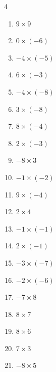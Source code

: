\begin{multicols}{4}
\begin{enumerate}
  \item $9\times 9$
        \phantom{$=81$}

  \item $0\times (-6)$
        \phantom{$=0$}

  \item $-4\times (-5)$
        \phantom{$=20$}

  \item $6\times (-3)$
        \phantom{$=-18$}

  \item $-4\times (-8)$
        \phantom{$=32$}

  \item $3\times (-8)$
        \phantom{$=-24$}

  \item $8\times (-4)$
        \phantom{$=-32$}

  \item $2\times (-3)$
        \phantom{$=-6$}

  \item $-8\times 3$
        \phantom{$=-24$}

  \item $-1\times (-2)$
        \phantom{$=2$}

  \item $9\times (-4)$
        \phantom{$=-36$}

  \item $2\times 4$
        \phantom{$=8$}

  \item $-1\times (-1)$
        \phantom{$=1$}

  \item $2\times (-1)$
        \phantom{$=-2$}

  \item $-3\times (-7)$
        \phantom{$=21$}

  \item $-2\times (-6)$
        \phantom{$=12$}

  \item $-7\times 8$
        \phantom{$=-56$}

  \item $8\times 7$
        \phantom{$=56$}

  \item $8\times 6$
        \phantom{$=48$}

  \item $7\times 3$
        \phantom{$=21$}

  \item $-8\times 5$
        \phantom{$=-40$}


\end{enumerate}
\end{multicols}
